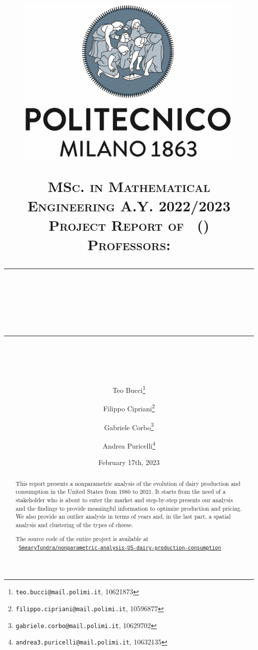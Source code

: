 \documentclass{article}
\title{
    \begin{figure}[htpb]
        \centering
        \includegraphics[scale=0.2]{images/logo-polimi}
    \end{figure}
    \normalfont \normalsize 
    \textsc{MSc. in Mathematical Engineering A.Y. 2022/2023\\ 
    Project Report of \coursename\ (\coursecode) \\
    Professors: \courseprof} \\
    [10pt] 
    \rule{\linewidth}{0.5pt} \\ [6pt] 
    \huge \papertitle \\
    \rule{\linewidth}{2pt}  \\ [10pt]
}
\author{
Teo Bucci\thanks{\texttt{teo.bucci@mail.polimi.it}, 10621873}
\and
Filippo Cipriani\thanks{\texttt{filippo.cipriani@mail.polimi.it}, 10596877}
\and
Gabriele Corbo\thanks{\texttt{gabriele.corbo@mail.polimi.it}, 10629702}
\and
Andrea Puricelli\thanks{\texttt{andrea3.puricelli@mail.polimi.it}, 10632135}
\and
}
\date{\normalsize February 17th, 2023}
\makeatletter
\renewcommand{\cleardoublepage}{
\clearpage\ifodd\c@page\else
\hbox{}
\vspace*{\fill}
\thispagestyle{empty}
\newpage
\fi}
\makeatother
\begin{document}
\maketitle

\begin{abstract}
    This report presents a nonparametric analysis of the evolution of dairy production and consumption in the United States from 1980 to 2021. It starts from the need of a stakeholder who is about to enter the market and step-by-step presents our analysis and the findings to provide meaningful information to optimize production and pricing. We also provide an outlier analysis in terms of years and, in the last part, a spatial analysis and clustering of the types of cheese.

    \vspace*{0.5cm}

    \begin{center}
        The source code of the entire project is available at\\
        \faGithub\ \href{https://github.com/SmearyTundra/nonparametric-analysis-US-dairy-production-consumption}{\texttt{SmearyTundra/nonparametric-analysis-US-dairy-production-consumption}}
    \end{center}
\end{abstract}

\clearpage

\tableofcontents

\setlength{\columnsep}{0.8cm}
    





\clearpage
\printbibliography
\end{document}
